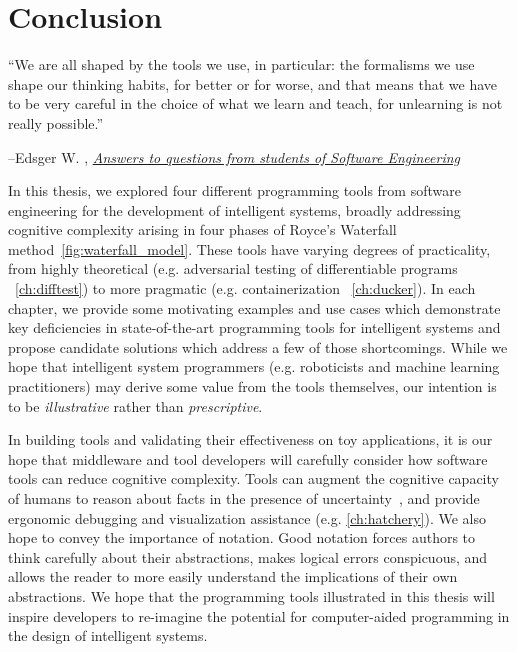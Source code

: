 \chapter{Conclusion}\label{ch:conclusion}
\setlength{\epigraphwidth}{0.90\textwidth}
\epigraph{``We are all shaped by the tools we use, in particular: the formalisms we use shape our thinking habits, for better or for worse, and that means that we have to be very careful in the choice of what we learn and teach, for unlearning is not really possible.''}{\begin{flushright}--Edsger W. \citet{dijkstra2000answers}, \href{https://www.cs.utexas.edu/~EWD/transcriptions/EWD13xx/EWD1305.html}{\textit{Answers to questions from students of Software Engineering}}\end{flushright}}

In this thesis, we explored four different programming tools from software engineering for the development of intelligent systems, broadly addressing cognitive complexity arising in four phases of Royce's Waterfall method~\autoref{fig:waterfall_model}. These tools have varying degrees of practicality, from highly theoretical (e.g. adversarial testing of differentiable programs ~\autoref{ch:difftest}) to more pragmatic (e.g. containerization ~\autoref{ch:ducker}). In each chapter, we provide some motivating examples and use cases which demonstrate key deficiencies in state-of-the-art programming tools for intelligent systems and propose candidate solutions which address a few of those shortcomings. While we hope that intelligent system programmers (e.g. roboticists and machine learning practitioners) may derive some value from the tools themselves, our intention is to be \textit{illustrative} rather than \textit{prescriptive}.

In building tools and validating their effectiveness on toy applications, it is our hope that middleware and tool developers will carefully consider how software tools can reduce cognitive complexity. Tools can augment the cognitive capacity of humans to reason about facts in the presence of uncertainty~\citep{famelis2012partial}, and provide ergonomic debugging and visualization assistance (e.g. \autoref{ch:hatchery}). We also hope to convey the importance of notation. Good notation forces authors to think carefully about their abstractions, makes logical errors conspicuous, and allows the reader to more easily understand the implications of their own abstractions. We hope that the programming tools illustrated in this thesis will inspire developers to re-imagine the potential for computer-aided programming in the design of intelligent systems.

